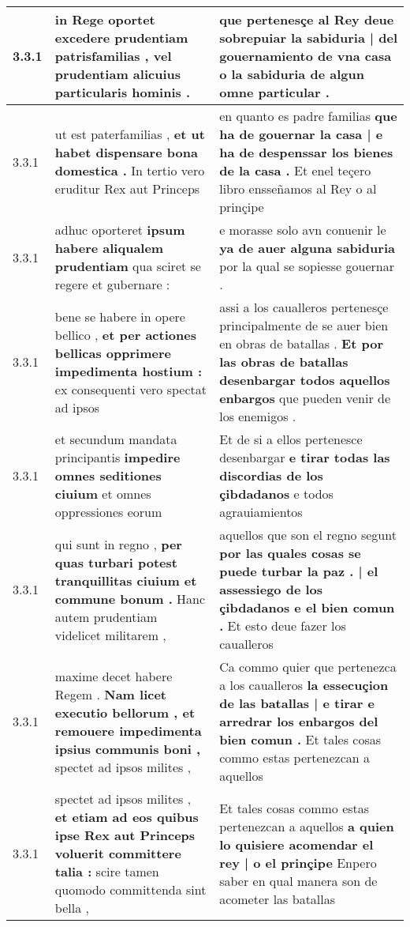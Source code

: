 \begin{tabular}{|p{1cm}|p{6.5cm}|p{6.5cm}|}
3.3.1 & in Rege oportet \textbf{ excedere prudentiam patrisfamilias , } vel prudentiam alicuius particularis hominis . & que pertenesçe al Rey deue \textbf{ sobrepuiar la sabiduria | del gouernamiento de vna casa } o la sabiduria de algun omne particular . \\\hline
3.3.1 & ut est paterfamilias , \textbf{ et ut habet dispensare bona domestica . } In tertio vero eruditur Rex aut Princeps & en quanto es padre familias \textbf{ que ha de gouernar la casa | e ha de despenssar los bienes de la casa . } Et enel teçero libro ensseñamos al Rey o al prinçipe \\\hline
3.3.1 & adhuc oporteret \textbf{ ipsum habere aliqualem prudentiam } qua sciret se regere et gubernare : & e morasse solo avn conuenir le \textbf{ ya de auer alguna sabiduria } por la qual se sopiesse gouernar . \\\hline
3.3.1 & bene se habere in opere bellico , \textbf{ et per actiones bellicas opprimere impedimenta hostium : } ex consequenti vero spectat ad ipsos & assi a los caualleros pertenesçe principalmente de se auer bien en obras de batallas . \textbf{ Et por las obras de batallas desenbargar todos aquellos enbargos } que pueden venir de los enemigos . \\\hline
3.3.1 & et secundum mandata principantis \textbf{ impedire omnes seditiones ciuium } et omnes oppressiones eorum & Et de si a ellos pertenesce desenbargar \textbf{ e tirar todas las discordias de los çibdadanos } e todos agrauiamientos \\\hline
3.3.1 & qui sunt in regno , \textbf{ per quas turbari potest tranquillitas ciuium et commune bonum . } Hanc autem prudentiam videlicet militarem , & aquellos que son el regno segunt \textbf{ por las quales cosas se puede turbar la paz . | el assessiego de los çibdadanos e el bien comun . } Et esto deue fazer los caualleros \\\hline
3.3.1 & maxime decet habere Regem . \textbf{ Nam licet executio bellorum , et remouere impedimenta ipsius communis boni , } spectet ad ipsos milites , & Ca commo quier que pertenezca a los caualleros \textbf{ la essecuçion de las batallas | e tirar e arredrar los enbargos del bien comun . } Et tales cosas commo estas pertenezcan a aquellos \\\hline
3.3.1 & spectet ad ipsos milites , \textbf{ et etiam ad eos quibus ipse Rex aut Princeps voluerit committere talia : } scire tamen quomodo committenda sint bella , & Et tales cosas commo estas pertenezcan a aquellos \textbf{ a quien lo quisiere acomendar el rey | o el prinçipe } Enpero saber en qual manera son de acometer las batallas \\\hline

\end{tabular}
